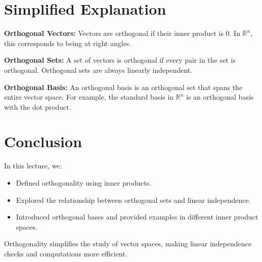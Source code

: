 \documentclass{article}
\begin{document}
\section*{Simplified Explanation}

\textbf{Orthogonal Vectors:}
Vectors are orthogonal if their inner product is 0. In $\mathbb{R}^n$, this corresponds to being at right angles.

\textbf{Orthogonal Sets:}
A set of vectors is orthogonal if every pair in the set is orthogonal. Orthogonal sets are always linearly independent.

\textbf{Orthogonal Basis:}
An orthogonal basis is an orthogonal set that spans the entire vector space. For example, the standard basis in $\mathbb{R}^n$ is an orthogonal basis with the dot product.

\section*{Conclusion}

In this lecture, we:
\begin{itemize}
  \item Defined orthogonality using inner products.
  \item Explored the relationship between orthogonal sets and linear independence.
  \item Introduced orthogonal bases and provided examples in different inner product spaces.
\end{itemize}

Orthogonality simplifies the study of vector spaces, making linear independence checks and computations more efficient.
\end{document}
